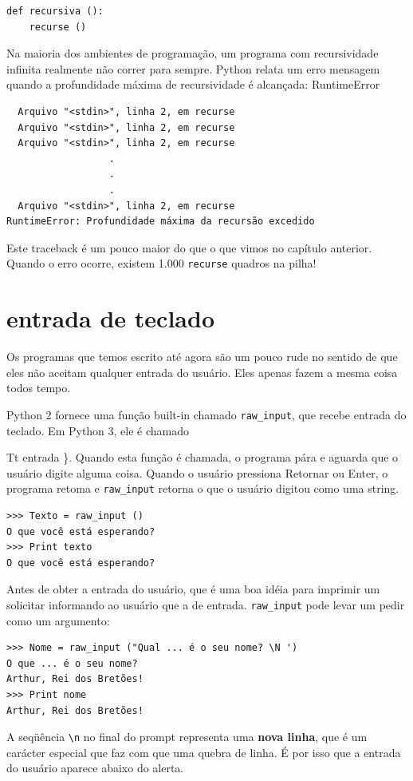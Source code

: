 \documentclass[10pt]{book}
\begin{document}
\begin{exercise}
{\begin{verbatim}
def recursiva ():
    recurse ()
\end{verbatim}
%
Na maioria dos ambientes de programação, um programa com recursividade infinita
realmente não correr para sempre. Python relata um erro
mensagem quando a profundidade máxima de recursividade é alcançada:
\index{} RuntimeError

\begin{verbatim}
  Arquivo "<stdin>", linha 2, em recurse
  Arquivo "<stdin>", linha 2, em recurse
  Arquivo "<stdin>", linha 2, em recurse
                  .   
                  .
                  .
  Arquivo "<stdin>", linha 2, em recurse
RuntimeError: Profundidade máxima da recursão excedido
\end{verbatim}
%
Este traceback é um pouco maior do que o que vimos no
capítulo anterior. Quando o erro ocorre, existem 1.000
{\tt recurse} quadros na pilha!


\section{entrada de teclado}

Os programas que temos escrito até agora são um pouco rude no sentido de que
eles não aceitam qualquer entrada do usuário. Eles apenas fazem a mesma coisa todos
tempo.

Python 2 fornece uma função built-in chamado \verb "raw_input", que recebe
entrada do teclado. Em Python 3, ele é chamado
  {Tt entrada \}. Quando esta função é chamada, o programa pára e
aguarda que o usuário digite alguma coisa. Quando o usuário pressiona {\sf
  Retornar} ou {\sf Enter}, o programa retoma e \verb "raw_input"
retorna o que o usuário digitou como uma string.

\begin{verbatim}
>>> Texto = raw_input ()
O que você está esperando?
>>> Print texto
O que você está esperando?
\end{verbatim}
%
Antes de obter a entrada do usuário, que é uma boa idéia para imprimir um
solicitar informando ao usuário que a de entrada. \Verb "raw_input" pode levar um
pedir como um argumento:

\begin{verbatim}
>>> Nome = raw_input ("Qual ... é o seu nome? \N ')
O que ... é o seu nome?
Arthur, Rei dos Bretões!
>>> Print nome
Arthur, Rei dos Bretões!
\end{verbatim}
%
A seqüência \verb "\n" no final do prompt representa uma {\bf nova linha},
que é um carácter especial que faz com que uma quebra de linha.
É por isso que a entrada do usuário aparece abaixo do alerta.

}}
\end{exercise}
\end{document}
